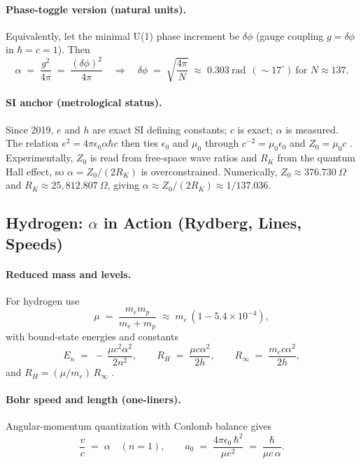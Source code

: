 \paragraph{Phase-toggle version (natural units).}
Equivalently, let the minimal U(1) phase increment be \(\delta\phi\) (gauge coupling \(g=\delta\phi\) in \(\hbar=c=1\)).
Then
\begin{equation}
\alpha \;=\; \frac{g^2}{4\pi} \;=\; \frac{(\delta\phi)^2}{4\pi}
\quad\Rightarrow\quad
\delta\phi \;=\; \sqrt{\frac{4\pi}{N}} \;\approx\; 0.303~\text{rad}\ \ (\sim 17^\circ)\ \text{for } N\!\approx\!137.
\end{equation}

\paragraph{SI anchor (metrological status).}
Since 2019, \(e\) and \(h\) are exact SI defining constants; \(c\) is exact; \(\alpha\) is measured.
The relation \(e^2=4\pi\epsilon_0\alpha\hbar c\) then ties \(\epsilon_0\) and \(\mu_0\) through \(c^{-2}=\mu_0\epsilon_0\) and
\(Z_0=\mu_0 c\) \cite{bipm2019si,tiesinga2021codata}.
Experimentally, \(Z_0\) is read from free-space wave ratios and \(R_K\) from the quantum Hall effect,
so \(\alpha=Z_0/(2R_K)\) is overconstrained.
Numerically, \(Z_0 \approx 376.730~\Omega\) and \(R_K \approx 25{,}812.807~\Omega\),
giving \(\alpha \approx Z_0/(2R_K)\approx 1/137.036\).

\subsection*{Hydrogen: \texorpdfstring{$\alpha$}{alpha} in Action (Rydberg, Lines, Speeds)}

\paragraph{Reduced mass and levels.}
For hydrogen use
\begin{equation}
\mu \;=\; \frac{m_e m_p}{m_e+m_p} \;\approx\; m_e\,(1-5.4\times 10^{-4}),
\end{equation}
with bound-state energies and constants
\begin{equation}
E_n \;=\; -\,\frac{\mu c^2 \alpha^2}{2 n^2},\qquad
R_H \;=\; \frac{\mu c \alpha^2}{2h},\qquad
R_\infty \;=\; \frac{m_e c \alpha^2}{2h},
\end{equation}
and \(R_H=(\mu/m_e)\,R_\infty\) \cite{griffiths2018quantum}.

\paragraph{Bohr speed and length (one-liners).}
Angular-momentum quantization with Coulomb balance gives
\begin{equation}
\frac{v}{c} \;=\; \alpha \quad (n=1), \qquad
a_0 \;=\; \frac{4\pi\epsilon_0\,\hbar^2}{\mu e^2} \;=\; \frac{\hbar}{\mu c\,\alpha}.
\end{equation}

